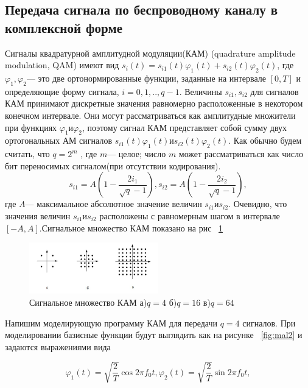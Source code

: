 \subsection{Передача сигнала по беспроводному каналу в комплексной форме}
Сигналы  квадратурной  амплитудной  модуляции(КАМ) (quadrature amplitude modulation, QAM) имеют вид  $s_{i}(t)=s_{i1}(t)\varphi_{1}(t)+s_{i2}(t)\varphi_{2}(t)$, где $\varphi_{1},\varphi_{2}$--- это две  ортонормированные  функции,  заданные  на  интервале $[0,T]$  и определяющие форму сигнала, $i=0,1,..,q-1$. Величины $ s_{i1},s_{i2}$   для  сигналов  КАМ  принимают дискретные  значения  равномерно  расположенные  в  некотором  конечном интервале.  Они  могут  рассматриваться  как  амплитудные  множители  при функциях $\varphi_{1} и \varphi_{2}$, поэтому сигнал КАМ представляет собой сумму двух ортогональных АМ сигналов $s_{i1}(t)\varphi_{1}(t) и s_{i2}(t)\varphi_{2}(t)$.
Как обычно будем считать, что $q=2^{m} $ , где  $m$--- целое; число $m$ может рассматриваться  как  число  бит  переносимых  сигналом(при отсутствии кодирования).
\begin{equation}
s_{i1}=A(1-\dfrac{2i_{1}}{\sqrt{q}-1}),s_{i2}=A(1-\dfrac{2i_{2}}{\sqrt{q}-1}), 
\end{equation} 
где $A$--- максимальное абсолютное значение величин $s_{i1} и s_{i2}$. Очевидно, что значения  величин $ s_{i1} и s_{i2}$ расположены  с  равномерным  шагом  в интервале $[-A,A]$.Сигнальное множество КАМ показано на рис ~\ref{fig:mal1}

\begin{figure}[H]
	\centering
	\includegraphics[width=0.5\textwidth]{img/mal1}
	\caption{Сигнальное множество КАМ а)$q=4$ б)$q=16$ в)$q=64$ }
	\label{fig:mal1}
\end{figure}

Напишим моделирующую программу КАМ для передачи $q=4$ сигналов.   
При моделировании базисные функции будут выглядить как на рисунке ~\ref{fig:mal2} и задаются выражениями вида 

\begin{equation}
\varphi_{1}(t)=\sqrt{\dfrac{2}{T}}\cos2\pi f_{0}t,
\varphi_{2}(t)=\sqrt{\dfrac{2}{T}}\sin2\pi f_{0}t,
\end{equation} 

